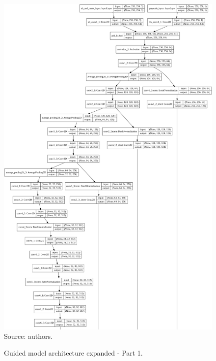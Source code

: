 \documentclass[12pt,openright,oneside,a4paper,english, brazilian]{abntex2}
\begin{document}
\begin{otherlanguage}{english}
\begin{apendicesenv}
\begin{figure}[!htb]
\centering
\caption{Guided model architecture expanded - Part 1.}
\includegraphics[height=\textheight - 38pt,keepaspectratio]{model_plot/Guided1}
Source: authors.
\label{guided_plot_1}
\end{figure}


\end{apendicesenv}
\end{otherlanguage}
\end{document}
